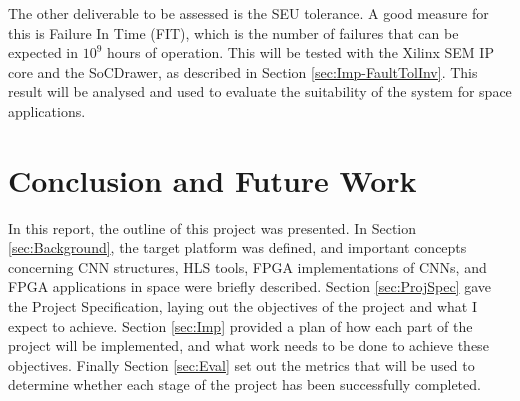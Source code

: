 \documentclass[12pt]{article}
\begin{document}
The other deliverable to be assessed is the SEU tolerance. A good measure for this is Failure In Time (FIT), which is the number of failures that can be expected in $10^9$ hours of operation. This will be tested with the Xilinx SEM IP core and the SoCDrawer, as described in Section \ref{sec:Imp-FaultTolInv}. This result will be analysed and used to evaluate the suitability of the system for space applications.

\newpage

\section{Conclusion and Future Work}
\label{sec:Conclusion}
\vspace{-12pt}

In this report, the outline of this project was presented. In Section \ref{sec:Background}, the target platform was defined, and important concepts concerning CNN structures, HLS tools, FPGA implementations of CNNs, and FPGA applications in space were briefly described. Section \ref{sec:ProjSpec} gave the Project Specification, laying out the objectives of the project and what I expect to achieve. Section \ref{sec:Imp} provided a plan of how each part of the project will be implemented, and what work needs to be done to achieve these objectives. Finally Section \ref{sec:Eval} set out the metrics that will be used to determine whether each stage of the project has been successfully completed. 

\newpage



\nocite{*}
\end{document}
